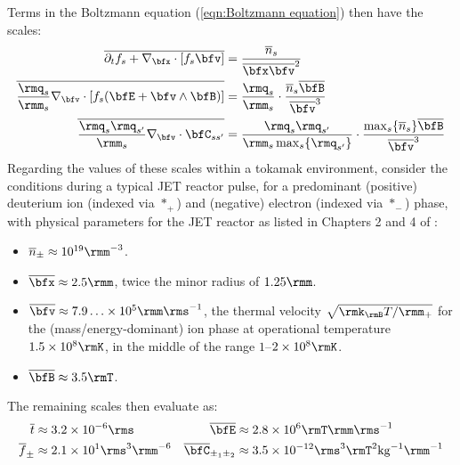     Terms in the Boltzmann equation (\ref{eqn:Boltzmann equation}) then have the scales:
    \begin{align}
        \overline{\partial_{t}f_{s} + \nabla_{\bfx}\cdot[f_{s}\bfv]}  &=  \frac{\overline{n}_{s}}{\overline{\bfx}\overline{\bfv}^{2}}  \label{eqn:convective scale}  \\
        \overline{\frac{\rmq_{s}}{\rmm_{s}}\nabla_{\bfv}\cdot[f_{s}(\bfE + \bfv\wedge\bfB)]}  &=  \frac{\rmq_{s}}{\rmm_{s}}\cdot\frac{\overline{n}_{s}\overline{\bfB}}{\overline{\bfv}^{3}}  \\
        \overline{\frac{\rmq_{s}\rmq_{s'}}{\rmm_{s}}\nabla_{\bfv}\cdot\bfC_{ss'}}  &=  \frac{\rmq_{s}\rmq_{s'}}{\rmm_{s}\max_{s}\{\rmq_{s'}\}}\cdot\frac{\max_{s}\{\overline{n}_{s}\}\overline{\bfB}}{\overline{\bfv}^{3}}  \label{eqn:collisional scale}
    \end{align}
    Regarding the values of these scales within a tokamak environment, consider the conditions during a typical JET reactor pulse, for a predominant (positive) deuterium ion (indexed via $*_{+}$) and (negative) electron (indexed via $*_{-}$) phase, with physical parameters for the JET reactor as listed in Chapters 2 and 4 of \cite{Wes00}:
    \begin{itemize}
        \item  $\overline{n}_{\pm}  \approx  10^{19}\rmm^{- 3}$.
        \item  $\overline{\bfx}     \approx  2.5\rmm$, twice the minor radius of $1.25\rmm$.
        \item  $\overline{\bfv}     \approx  7.9\ldots\times 10^{5}\rmm\rms^{- 1}$, the thermal velocity $\sqrt{\rmk_{\rmB}T/\rm\rmm_{+}}$ for the (mass/energy-dominant) ion phase at operational temperature $1.5\times 10^{8}\rmK$, in the middle of the range $1$--$2\times 10^{8}\rmK$.
        \item  $\overline{\bfB}     \approx  3.5\rmT$.
    \end{itemize}    
    The remaining scales then evaluate as:
    \begin{align*}
        \overline{t}           &\approx  3.2\times 10^{- 6}\rms              &
        \overline{\bfE}        &\approx  2.8\times 10^{6}\rmT\rmm\rms^{- 1}  \\
        \overline{f}_{\pm}     &\approx  2.1\times 10^{1}\rms^{3}\rmm^{- 6}  &
        \overline{\bfC}_{\pm_{1}\pm_{2}}  &\approx  3.5\times 10^{- 12}\rms^{3}\rmT^{2}{\rm kg}^{- 1}\rmm^{- 1}
    \end{align*}
    
